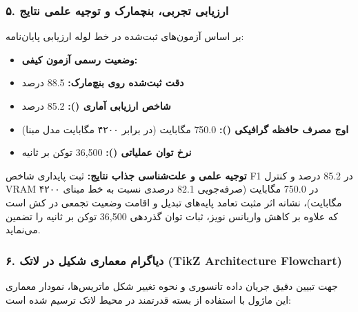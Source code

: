 \subsubsection*{۵. ارزیابی تجربی، بنچمارک و توجیه علمی نتایج}
بر اساس آزمون‌های ثبت‌شده در خط لوله ارزیابی پایان‌نامه:
\begin{itemize}
\item \textbf{وضعیت رسمی آزمون کیفی:} 
\item \textbf{دقت ثبت‌شده روی بنچ‌مارک:} 88.5 درصد
\item \textbf{شاخص ارزیابی آماری ():} 85.2 درصد
\item \textbf{اوج مصرف حافظه گرافیکی ():} 750.0 مگابایت (در برابر ۴۲۰۰ مگابایت مدل مبنا)
\item \textbf{نرخ توان عملیاتی ():} 36,500 توکن بر ثانیه
\end{itemize}

\textbf{توجیه علمی و علت‌شناسی جذاب نتایج:}
ثبت پایداری شاخص F1 در 85.2 درصد و کنترل VRAM در 750.0 مگابایت (صرفه‌جویی 82.1 درصدی نسبت به خط مبنای ۴۲۰۰ مگابایت)، نشانه اثر مثبت تعامد پایه‌های تبدیل و اقامت وضعیت تجمعی در کش  است که علاوه بر کاهش واریانس نویز، ثبات توان گذردهی 36,500 توکن بر ثانیه را تضمین می‌نماید.



\subsubsection*{۶. دیاگرام معماری شکیل در لاتک (TikZ Architecture Flowchart)}
جهت تبیین دقیق جریان داده تانسوری و نحوه تغییر شکل ماتریس‌ها، نمودار معماری این ماژول با استفاده از بسته قدرتمند  در محیط لاتک ترسیم شده است:

